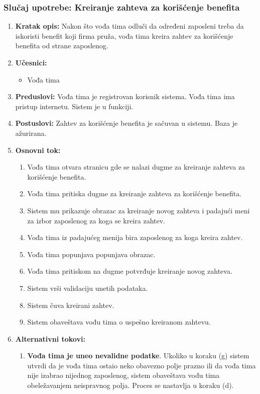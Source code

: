 \documentclass[a4paper]{article}
\begin{document}
\subsubsection{Slučaj upotrebe: Kreiranje zahteva za korišćenje benefita}
\begin{enumerate}
    \item \textbf{Kratak opis:} Nakon što vođa tima odluči da određeni zaposleni treba da iskoristi benefit koji firma pruža, vođa tima kreira zahtev za korišćenje benefita od strane zaposlenog.
    \item \textbf{Učesnici:}
        \begin{itemize}
            \item Vođa tima
        \end{itemize}
    \item \textbf{Preduslovi:} Vođa tima je registrovan korisnik sistema. Vođa tima ima pristup internetu. Sistem je u funkciji.
    \item \textbf{Postuslovi:} Zahtev za korišćenje benefita je sačuvan u sistemu. Baza je ažurirana.
    \item \textbf{Osnovni tok:}
        \begin{enumerate}
            \item Vođa tima otvara stranicu gde se nalazi dugme za kreiranje zahteva za korišćenje benefita.
            \item Vođa tima pritiska dugme za kreiranje zahteva za korišćenje benefita.
            \item Sistem mu prikazuje obrazac za kreiranje novog zahteva i padajući meni za izbor zaposlenog za koga se kreira zahtev.
            \item Vođa tima iz padajućeg menija bira zaposlenog za koga kreira zahtev.
            \item Vođa tima popunjava popunjava obrazac.
            \item Vođa tima pritiskom na dugme potvrđuje kreiranje novog zahteva.
            \item Sistem vrši validaciju unetih podataka.
            \item Sistem čuva kreirani zahtev.
            \item Sistem obaveštava vođu tima o uspešno kreiranom zahtevu.
        \end{enumerate}
    \item \textbf{Alternativni tokovi:}
        \begin{enumerate}
            \item \textbf{Vođa tima je uneo nevalidne podatke}. Ukoliko u koraku (g) sistem utvrdi da je vođa tima ostaio neko obavezno polje prazno ili da vođa tima nije izabrao nijednog zaposlenog, sistem obaveštava vođu tima obeležavanjem neispravnog polja. Proces se nastavlja u koraku (d).

\end{enumerate}
\end{enumerate}
\end{document}
